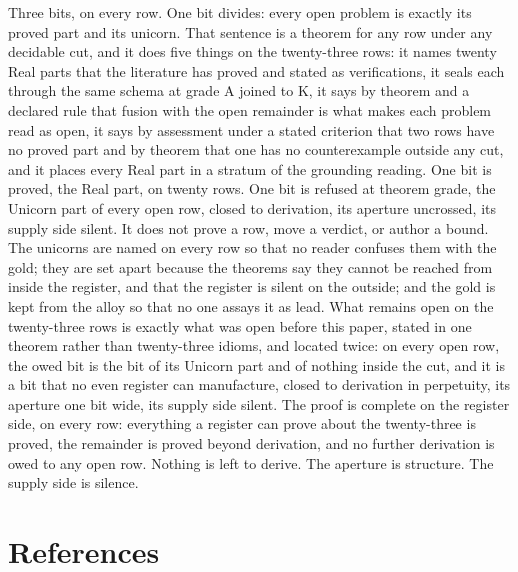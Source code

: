 \documentclass[10pt]{article}
\begin{document}
Three bits, on every row. One bit divides: every open problem is exactly
its proved part and its unicorn. That sentence is a theorem for any row
under any decidable cut, and it does five things on the twenty-three
rows: it names twenty Real parts that the literature has proved and
stated as verifications, it seals each through the same schema at grade
A joined to K, it says by theorem and a declared rule that fusion with
the open remainder is what makes each problem read as open, it says by
assessment under a stated criterion that two rows have no proved part
and by theorem that one has no counterexample outside any cut, and it
places every Real part in a stratum of the grounding reading. One bit is
proved, the Real part, on twenty rows. One bit is refused at theorem
grade, the Unicorn part of every open row, closed to derivation, its
aperture uncrossed, its supply side silent. It does not prove a row,
move a verdict, or author a bound. The unicorns are named on every row
so that no reader confuses them with the gold; they are set apart
because the theorems say they cannot be reached from inside the
register, and that the register is silent on the outside; and the gold
is kept from the alloy so that no one assays it as lead. What remains
open on the twenty-three rows is exactly what was open before this
paper, stated in one theorem rather than twenty-three idioms, and
located twice: on every open row, the owed bit is the bit of its Unicorn
part and of nothing inside the cut, and it is a bit that no even
register can manufacture, closed to derivation in perpetuity, its
aperture one bit wide, its supply side silent. The proof is complete on
the register side, on every row: everything a register can prove about
the twenty-three is proved, the remainder is proved beyond derivation,
and no further derivation is owed to any open row. Nothing is left to
derive. The aperture is structure. The supply side is silence.

\hypertarget{references}{%
\section{References}\label{references}}
\end{document}
